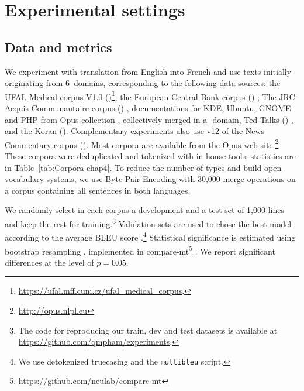 \section{Experimental settings \label{sec:experiments-chap4}}

\subsection{Data and metrics \label{ssec:corpora-chap4}}

We experiment with translation from English into French and use texts initially originating from 6~domains, corresponding to the following data sources: the UFAL Medical corpus V1.0 ()\footnote{\url{https://ufal.mff.cuni.cz/ufal_medical_corpus}. }, the European Central Bank corpus () \citep{Tiedemann12parallel}; The JRC-Acquis Communautaire corpus () \citep{Steinberger06acquis}, documentations for KDE, Ubuntu, GNOME and PHP from Opus collection \citep{Tiedemann09news}, collectively merged in a -domain, Ted Talks () \citep{Cettolo12wit}, and the Koran (). Complementary experiments also use v12 of the News Commentary corpus (). Most corpora are available from the Opus web site.\footnote{\url{http://opus.nlpl.eu}} These corpora were deduplicated and tokenized with in-house tools; statistics are in Table~\ref{tab:Corpora-chap4}. To reduce the number of types and build open-vocabulary systems, we use Byte-Pair Encoding \citep{Sennrich16neural} with 30,000 merge operations on a corpus containing all sentences in both languages.

We randomly select in each corpus a development and a test set of 1,000 lines and keep the rest for training.\footnote{The code for reproducing our train, dev and test datasets is available at \url{https://github.com/qmpham/experiments}.} Validation sets are used to chose the best model according to the average BLEU score \citep{Papineni02bleu}.\footnote{We use detokenized truecasing and the \texttt{multibleu} script.} Statistical significance is estimated using bootstrap resampling \citep{Koehn04statistical}, implemented in compare-mt\footnote{\url{https://github.com/neulab/compare-mt}} \citep{Neubig19compare-mt}. We report significant differences at the level of $p=0.05$.

